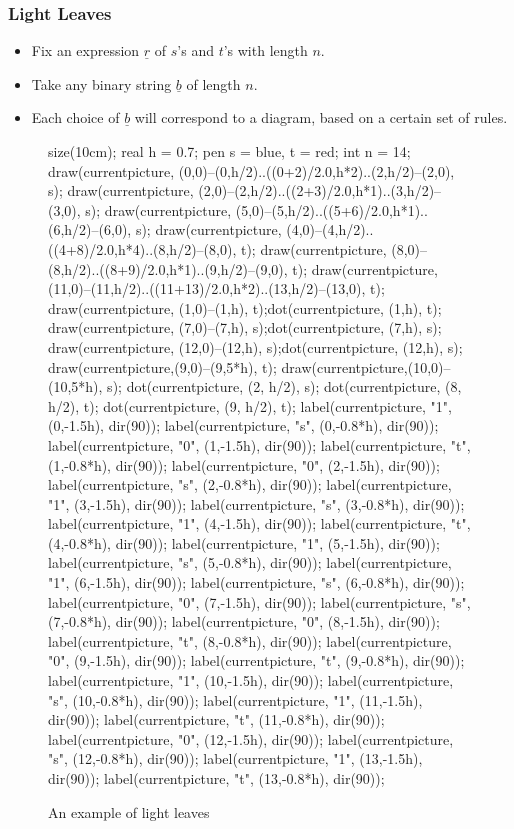 \documentclass[pdf]{beamer}
\def\ii{\item}
\theoremstyle{definition}
\def\ul#1{\underline{#1}}
\begin{document}
\begin{frame}[fragile]
	\frametitle{Light Leaves}
	\begin{itemize}
		\ii Fix an expression $\ul r$ of $s$'s and $t$'s with length $n$.
		\ii Take any binary string $\ul b$ of length $n$.
		\ii Each choice of $\ul b$ will correspond to a diagram, based on a certain set of rules.
	\end{itemize}
	\begin{figure}[ht]
		\centering
		\begin{asy}
		size(10cm);
		real h = 0.7;
		pen s = blue, t = red;
		int n = 14;
		draw(currentpicture, (0,0)--(0,h/2)..((0+2)/2.0,h*2)..(2,h/2)--(2,0), s);
		draw(currentpicture, (2,0)--(2,h/2)..((2+3)/2.0,h*1)..(3,h/2)--(3,0), s);
		draw(currentpicture, (5,0)--(5,h/2)..((5+6)/2.0,h*1)..(6,h/2)--(6,0), s);
		draw(currentpicture, (4,0)--(4,h/2)..((4+8)/2.0,h*4)..(8,h/2)--(8,0), t);
		draw(currentpicture, (8,0)--(8,h/2)..((8+9)/2.0,h*1)..(9,h/2)--(9,0), t);
		draw(currentpicture, (11,0)--(11,h/2)..((11+13)/2.0,h*2)..(13,h/2)--(13,0), t);
		draw(currentpicture, (1,0)--(1,h), t);dot(currentpicture, (1,h), t);
		draw(currentpicture, (7,0)--(7,h), s);dot(currentpicture, (7,h), s);
		draw(currentpicture, (12,0)--(12,h), s);dot(currentpicture, (12,h), s);
		draw(currentpicture,(9,0)--(9,5*h), t);
		draw(currentpicture,(10,0)--(10,5*h), s);
		dot(currentpicture, (2, h/2), s);
		dot(currentpicture, (8, h/2), t);
		dot(currentpicture, (9, h/2), t);
		label(currentpicture, "1", (0,-1.5h), dir(90));
		label(currentpicture, "s", (0,-0.8*h), dir(90));
		label(currentpicture, "0", (1,-1.5h), dir(90));
		label(currentpicture, "t", (1,-0.8*h), dir(90));
		label(currentpicture, "0", (2,-1.5h), dir(90));
		label(currentpicture, "s", (2,-0.8*h), dir(90));
		label(currentpicture, "1", (3,-1.5h), dir(90));
		label(currentpicture, "s", (3,-0.8*h), dir(90));
		label(currentpicture, "1", (4,-1.5h), dir(90));
		label(currentpicture, "t", (4,-0.8*h), dir(90));
		label(currentpicture, "1", (5,-1.5h), dir(90));
		label(currentpicture, "s", (5,-0.8*h), dir(90));
		label(currentpicture, "1", (6,-1.5h), dir(90));
		label(currentpicture, "s", (6,-0.8*h), dir(90));
		label(currentpicture, "0", (7,-1.5h), dir(90));
		label(currentpicture, "s", (7,-0.8*h), dir(90));
		label(currentpicture, "0", (8,-1.5h), dir(90));
		label(currentpicture, "t", (8,-0.8*h), dir(90));
		label(currentpicture, "0", (9,-1.5h), dir(90));
		label(currentpicture, "t", (9,-0.8*h), dir(90));
		label(currentpicture, "1", (10,-1.5h), dir(90));
		label(currentpicture, "s", (10,-0.8*h), dir(90));
		label(currentpicture, "1", (11,-1.5h), dir(90));
		label(currentpicture, "t", (11,-0.8*h), dir(90));
		label(currentpicture, "0", (12,-1.5h), dir(90));
		label(currentpicture, "s", (12,-0.8*h), dir(90));
		label(currentpicture, "1", (13,-1.5h), dir(90));
		label(currentpicture, "t", (13,-0.8*h), dir(90));
		\end{asy}
		\caption{An example of light leaves}
	\end{figure}
\end{frame}
\end{document}
